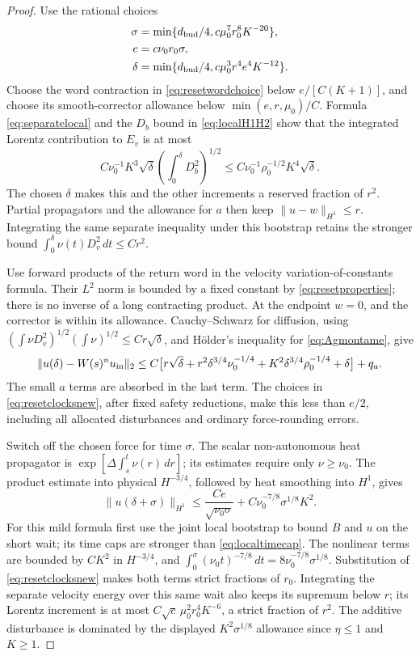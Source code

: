 \documentclass[11pt,a4paper]{amsart}
\theoremstyle{definition}
\theoremstyle{remark}
\numberwithin{equation}{section}
\newcommand{\norm}[1]{\lVert #1\rVert}
\begin{document}
\begin{proof}
Use the rational choices
\begin{align}\label{eq:resetclocksnew}
 \sigma&=\min\{d_{\rm bud}/4,c\mu_0^7r_0^8K^{-20}\},\notag\\
 e&=c\nu_0r_0\sigma,\notag\\
 \delta&=\min\{d_{\rm bud}/4,c\mu_0^3r^4e^4K^{-12}\}.
\end{align}
Choose the word contraction in \eqref{eq:resetwordchoice} below $e/[C(K+1)]$, and choose its smooth-corrector allowance below $\min(e,r,\mu_0)/C$. Formula \eqref{eq:separatelocal} and the $D_b$ bound in \eqref{eq:localH1H2} show that the integrated Lorentz contribution to $E_v$ is at most
\[
 C\nu_0^{-1}K^3\sqrt\delta
      \left(\int_0^\delta D_b^2\right)^{1/2}
 \le C\nu_0^{-1}\rho_0^{-1/2}K^4\sqrt\delta.
\]
The chosen $\delta$ makes this and the other increments a reserved fraction of $r^2$. Partial propagators and the allowance for $a$ then keep $\norm{u-w}_{H^1}\le r$. Integrating the same separate inequality under this bootstrap retains the stronger bound $\int_0^\delta\nu(t)D_v^2\,dt\le Cr^2$.

Use forward products of the return word in the velocity variation-of-constants formula. Their $L^2$ norm is bounded by a fixed constant by \eqref{eq:resetproperties}; there is no inverse of a long contracting product. At the endpoint $w=0$, and the corrector is within its allowance. Cauchy--Schwarz for diffusion, using $(\int\nu D_v^2)^{1/2}(\int\nu)^{1/2}\le Cr\sqrt\delta$, and H\"older's inequality for \eqref{eq:Agmontame}, give
\begin{align}\label{eq:resetendpoint}
 \norm{u(\delta)-W(s)^nu_{\rm in}}_2
 \le C\bigl[ r\sqrt\delta
 +r^2\delta^{3/4}\nu_0^{-1/4}
 +K^2\delta^{3/4}\rho_0^{-1/4}+\delta\bigr]+q_a.
\end{align}
The small $a$ terms are absorbed in the last term. The choices in \eqref{eq:resetclocksnew}, after fixed safety reductions, make this less than $e/2$, including all allocated disturbances and ordinary force-rounding errors.

Switch off the chosen force for time $\sigma$. The scalar non-autonomous heat propagator is
$\exp[\Delta\int_s^t\nu(r)\,dr]$; its estimates require only $\nu\ge\nu_0$. The product estimate into physical $H^{-3/4}$, followed by heat smoothing into $H^1$, gives
\begin{equation}\label{eq:smoothingreset}
 \norm{u(\delta+\sigma)}_{H^1}
 \le\frac{Ce}{\sqrt{\nu_0\sigma}}
       +C\nu_0^{-7/8}\sigma^{1/8}K^2.
\end{equation}
For this mild formula first use the joint local bootstrap to bound $B$ and $u$ on the short wait; its time caps are stronger than \eqref{eq:localtimecap}. The nonlinear terms are bounded by $CK^2$ in $H^{-3/4}$, and $\int_0^\sigma(\nu_0t)^{-7/8}\,dt=8\nu_0^{-7/8}\sigma^{1/8}$. Substitution of \eqref{eq:resetclocksnew} makes both terms strict fractions of $r_0$. Integrating the separate velocity energy over this same wait also keeps its supremum below $r$; its Lorentz increment is at most $C\sqrt c\,\mu_0^2r_0^4K^{-6}$, a strict fraction of $r^2$. The additive disturbance is dominated by the displayed $K^2\sigma^{1/8}$ allowance since $\eta\le1$ and $K\ge1$.


\end{proof}
\end{document}
